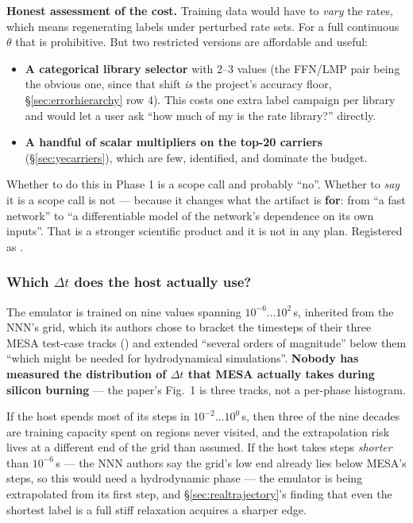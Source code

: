 \textbf{Honest assessment of the cost.} Training data would have to \emph{vary}
the rates, which means regenerating labels under perturbed rate sets. For a full
continuous $\theta$ that is prohibitive. But two restricted versions are
affordable and useful:

\begin{itemize}
\item \textbf{A categorical library selector} with 2--3 values (the FFN/LMP pair
  being the obvious one, since that shift \emph{is} the project's accuracy
  floor, \S\ref{sec:errorhierarchy} row 4). This costs one extra label campaign
  per library and would let a user ask ``how much of my \Ye{} is the rate
  library?'' directly.
\item \textbf{A handful of scalar multipliers on the top-20 \Ye{} carriers}
  (\S\ref{sec:yecarriers}), which are few, identified, and dominate the budget.
\end{itemize}

Whether to do this in Phase 1 is a scope call and probably ``no''. Whether to
\emph{say} it is a scope call is not --- because it changes what the artifact is
\textbf{for}: from ``a fast network'' to ``a differentiable model of the
network's dependence on its own inputs''. That is a stronger scientific product
and it is not in any plan. Registered as .

\subsubsection{Which \texorpdfstring{$\Delta t$}{dt} does the host actually use?}
\label{sec:hostdt}

The emulator is trained on nine values spanning $10^{-6}\ldots10^{2}$\,s,
inherited from the NNN's grid, which its authors chose to bracket the timesteps
of their three MESA test-case tracks (\citealt[\S 2.2 and Fig.~1]{grichener2025})
and extended ``several orders of magnitude'' below them ``which might be needed
for hydrodynamical simulations''. \textbf{Nobody has measured the distribution
of $\Delta t$ that MESA actually takes during silicon burning} --- the paper's
Fig.~1 is three tracks, not a per-phase histogram.

If the host spends most of its steps in $10^{-2}\ldots10^{0}$\,s, then three of
the nine decades are training capacity spent on regions never visited, and the
extrapolation risk lives at a different end of the grid than assumed. If the
host takes steps \emph{shorter} than $10^{-6}$\,s --- the NNN authors say the
grid's low end already lies below MESA's steps, so this would need a
hydrodynamic phase --- the emulator is being extrapolated from its first step,
and \S\ref{sec:realtrajectory}'s finding that even the shortest label is a full
stiff relaxation acquires a sharper edge.

